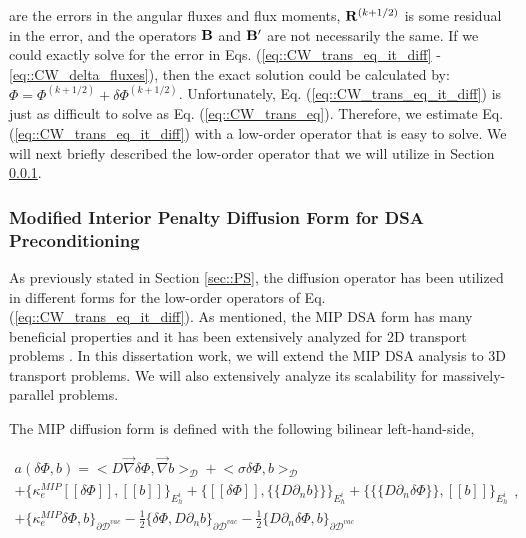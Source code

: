 \documentclass[11pt]{article}
\begin{document}
\noindent are the errors in the angular fluxes and flux moments, ${\bf R}^{(k+1/2)}$ is some residual in the error, and the operators ${\bf B}$ and ${\bf B'}$ are not necessarily the same. If we could exactly solve for the error in Eqs. (\ref{eq::CW_trans_eq_it_diff} - \ref{eq::CW_delta_fluxes}), then the exact solution could be calculated by: $\Phi =  \Phi^{(k+1/2)} + \delta \Phi^{(k+1/2)}$. Unfortunately, Eq. (\ref{eq::CW_trans_eq_it_diff}) is just as difficult to solve as Eq. (\ref{eq::CW_trans_eq}). Therefore, we estimate Eq. (\ref{eq::CW_trans_eq_it_diff}) with a low-order operator that is easy to solve. We will next briefly described the low-order operator that we will utilize in Section \ref{sec::CW_DSA_MIP}.


\subsubsection{Modified Interior Penalty Diffusion Form for DSA Preconditioning}
\label{sec::CW_DSA_MIP}

As previously stated in Section \ref{sec::PS}, the diffusion operator has been utilized in different forms for the low-order operators of Eq. (\ref{eq::CW_trans_eq_it_diff}). As mentioned, the MIP DSA form has many beneficial properties and it has been extensively analyzed for 2D transport problems \cite{ref::DSA_wang_ragusa,turcksin2014discontinuous}. In this dissertation work, we will extend the MIP DSA analysis to 3D transport problems. We will also extensively analyze its scalability for massively-parallel problems.

The MIP diffusion form is defined with the following bilinear left-hand-side,

\begin{equation}
\label{eq::mip_lhs}
\begin{aligned}
a(\delta \Phi, b)  = \Big<  D \vec{\nabla} \delta  \Phi , \vec{\nabla} b \Big>_{\mathcal{D}} + \Big<  \sigma \delta  \Phi , b  \Big>_{\mathcal{D}}    \\
+  \Big\{ \kappa_e^{MIP} [\![ \delta  \Phi ]\!] , [\![  b ]\!]\Big\}_{E_h^i} + \Big\{  [\![  \delta \Phi ]\!] , \{\!\{  D \partial_n b \}\!\}\Big\}_{E_h^i}  + \Big\{ \{\!\{  D \partial_n \delta \Phi \}\!\} , [\![ b ]\!]\Big\}_{E_h^i} \\
+ \Big\{ \kappa_e^{MIP}  \delta \Phi ,   b \Big\}_{\partial \mathcal{D}^{vac}} - \frac{1}{2} \Big\{  \delta \Phi  ,  D \partial_n b \Big\}_{\partial \mathcal{D}^{vac}} - \frac{1}{2} \Big\{   D \partial_n \delta  \Phi , b \Big\}_{\partial \mathcal{D}^{vac}}  
\end{aligned} ,
\end{equation}
\end{document}
